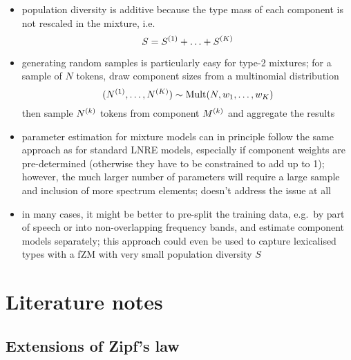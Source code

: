 \documentclass[a4paper]{article}
\begin{document}
\begin{itemize}
\item population diversity is additive because the type mass of each component
  is not rescaled in the mixture, i.e.\
  \begin{equation}
    \label{eq:models:mixtures:population-diversity}
    S = S^{(1)} + \ldots + S^{(K)}
  \end{equation}
\item generating random samples is particularly easy for type-2 mixtures; for
  a sample of $N$ tokens, draw component sizes from a multinomial distribution
  \begin{equation}
    \label{eq:models:mixtures:subsample-multinom}
    (N^{(1)}, \ldots, N^{(K)}) \sim
    \text{Mult}(N, w_1, \ldots, w_K)
  \end{equation}
  then sample $N^{(k)}$ tokens from component $M^{(k)}$ and aggregate the
  results
\item parameter estimation for mixture models can in principle follow the same
  approach as for standard LNRE models, especially if component weights are
  pre-determined (otherwise they have to be constrained to add up to 1);
  however, the much larger number of parameters will require a large sample
  and inclusion of more spectrum elements; \citet[Ch.~4]{Baayen:01} doesn't
  address the issue at all
\item in many cases, it might be better to pre-split the training data, e.g.\
  by part of speech or into non-overlapping frequency bands, and estimate
  component models separately; this approach could even be used to capture
  lexicalised types with a fZM with very small population diversity $S$
\end{itemize}


\section{Literature notes}
\label{sec:literature}

\subsection{Extensions of Zipf's law}
\label{sec:lit:extensions}

\subsubsection{\cite{Montemurro:01}}
\label{sec:lit:ext:Montemurro2001}
\end{document}
